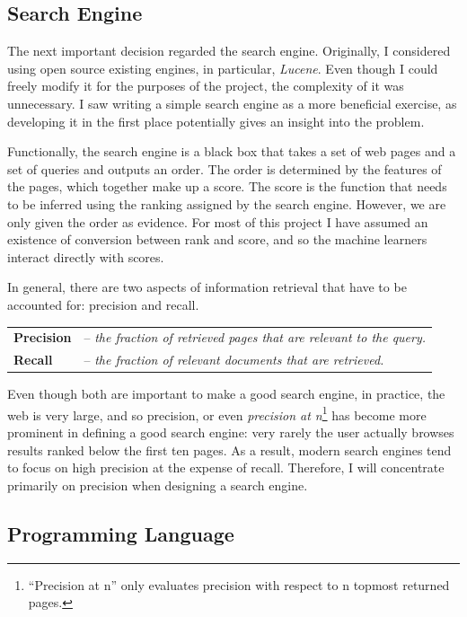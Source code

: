 \documentclass[12pt,a4paper,notitlepage,twoside]{scrbook}
\begin{document}
\subsection{Search Engine}
\label{prep:se}
The next important decision regarded the search engine.  Originally, I considered
using open source existing engines, in particular, \textit{Lucene}. Even though I could
freely modify it for the purposes of the project, the complexity of it was
unnecessary. I saw writing a simple search engine as a more beneficial
exercise, as developing it in the first place potentially gives an insight into
the problem.

Functionally, the search engine is a black box that takes a set of web pages and a set of
queries and outputs an order. The order is determined by the features of the pages, which
together make up a score. The score is the function that needs to be inferred using the
ranking assigned by the search engine. However, we are only given the order as evidence.
For most of this project I have assumed an existence of conversion between rank and score,
and so the machine learners interact directly with scores. 

In general, there are two aspects of information retrieval that have to be accounted for:
precision and recall.  

\begin{tabular}{l l}
	\textbf{Precision} & -- \textit{the fraction of retrieved pages that are
relevant to the query.}  \\
\textbf{Recall} & -- \textit{the fraction of relevant documents that are
retrieved.} \\ 
\end{tabular}

Even though both are important to make a good search engine, in practice, the
web is very large, and so precision, or even \textit{precision at n}\footnote{``Precision
at n'' only evaluates precision with respect to n topmost returned pages.} has become more
prominent in defining a good search engine: very rarely the user actually browses results
ranked below the first ten pages. As a result, modern search engines tend
to focus on high precision at the expense of recall\cite{GOOGLE}. Therefore, I will
concentrate primarily on precision when designing a search engine.


\subsection{Programming Language}
\end{document}
